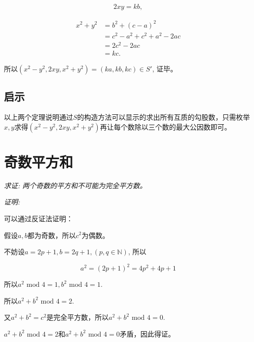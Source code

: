 \documentclass{article}
\renewcommand{\mod}{\text{ mod }}
\begin{document}
    \begin{align*}
        2xy = kb,
    \end{align*}

    \begin{align*}
        x^2 + y^2 &= b^2 + (c - a)^2\\
        &= c^2 - a^2 + c^2 + a^2 -2ac \\
        &= 2c^2 - 2ac  \\
        &= kc.
    \end{align*}

    所以$(x^2-y^2,2xy,x^2+y^2) = (ka,kb,kc) \in S'$, 证毕。

    \subsection{启示}
    以上两个定理说明通过$S$的构造方法可以显示的求出所有互质的勾股数，只需枚举$x,y$求得$(x^2-y^2,2xy,x^2+y^2)$再让每个数除以三个数的最大公因数即可。


    \section{奇数平方和}

    \emph{求证: 两个奇数的平方和不可能为完全平方数。}

    \emph{证明:} 

    可以通过反证法证明：

    假设$a,b$都为奇数，所以$c^2 $为偶数。
    
    不妨设$a = 2p+1, b = 2q + 1, (p,q\in \mathbb{N})$, 所以
    
    $$a^2 = (2p+1)^2 = 4p^2 + 4p + 1$$

    所以$a^2 \mod 4 = 1, b^2 \mod 4 = 1$.

    所以$a^2 + b^2 \mod 4 = 2$.

    又$a^2 + b^2 = c^2$是完全平方数，所以$a^2 + b^2 \mod 4 = 0$.

    $a^2 + b^2 \mod 4 = 2$和$a^2 + b^2 \mod 4 = 0$矛盾，因此得证。
\end{document}
